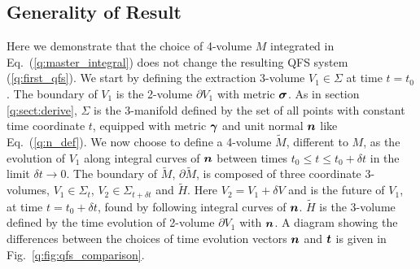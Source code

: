 \subsection{Generality of Result} \label{q:sect:generality}
Here we demonstrate that the choice of 4-volume $M$ integrated in Eq.~(\ref{q:master_integral}) does not change the resulting QFS system (\ref{q:first_qfs}). We start by defining the extraction 3-volume $V_1\in\Sigma$ at time $t=t_0$. The boundary of $V_1$ is the 2-volume $\partial V_1$ with metric $\boldsymbol{\sigma}$. As in section \ref{q:sect:derive}, $\Sigma$ is the 3-manifold defined by the set of all points with constant time coordinate $t$, equipped with metric $\boldsymbol{\gamma}$ and unit normal $\boldsymbol{n}$ like Eq.~(\ref{q:n_def}). We now choose to define a 4-volume $\tilde{M}$, different to $M$, as the evolution of $V_1$ along integral curves of $\boldsymbol{n}$ between times $t_0 \leq t \leq t_0 + \delta t$ in the limit $\delta t \rightarrow 0$. The boundary of $\tilde{M}$, $\partial \tilde M$, is composed of three coordinate 3-volumes, $V_1\in\Sigma_t$, $V_2\in\Sigma_{t+\delta t}$ and $\tilde{H}$. Here $V_2=V_1 + \delta V$ and is the future of $V_1$, at time $t=t_0 +\delta t$, found by following integral curves of $\boldsymbol{n}$. $\tilde{H}$ is the 3-volume defined by the time evolution of 2-volume $\partial V_1$ with $\boldsymbol{n}$. A diagram showing the differences between the choices of time evolution vectors $\boldsymbol{n}$ and $\boldsymbol{t}$ is given in Fig.~\ref{q:fig:qfs_comparison}.


